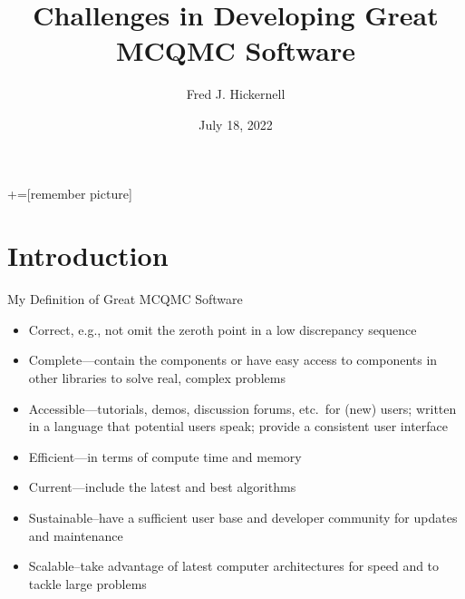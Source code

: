 \documentclass[11pt,compress,xcolor={usenames,dvipsnames},aspectratio=169]{beamer}
\title{Challenges in Developing Great MCQMC Software}
\author[]{Fred J. Hickernell}
\institute{Department of Applied Mathematics \&
	Center for Interdisciplinary Scientific Computation \\  Illinois Institute of Technology \quad
	\href{mailto:hickernell@iit.edu}{\url{hickernell@iit.edu}} \quad
	\href{http://mypages.iit.edu/~hickernell}{\url{mypages.iit.edu/~hickernell}}}
\date[]{July 18, 2022}
\begin{document}
	+=[remember picture]
	\everymath{\displaystyle}

\frame{\titlepage}


\section{Introduction}

\begin{frame}{My Definition of Great MCQMC Software}
	
	\vspace{-5ex}
	\begin{itemize}
		\item \alert{Correct}, e.g., not omit the zeroth point in a low discrepancy sequence \parencite{Owe22a, scipySobol2020a}
	
		\item  \alert{Complete}---contain the components or have easy access to components in other libraries to solve real, complex problems
		
		\item  \alert{Accessible}---tutorials, demos, discussion forums, etc.\ for (new) users; written in a language that potential users speak; provide a consistent user interface
		
		\item \alert{Efficient}---in terms of compute time and memory
				
		\item \alert{Current}---include the latest and best algorithms

		\item  \alert{Sustainable}--have a sufficient user base and developer community for updates and maintenance
		
		\item \alert{Scalable}--take advantage of latest computer architectures for speed and to tackle large problems
		
	\end{itemize}
\end{frame}
\end{document}
